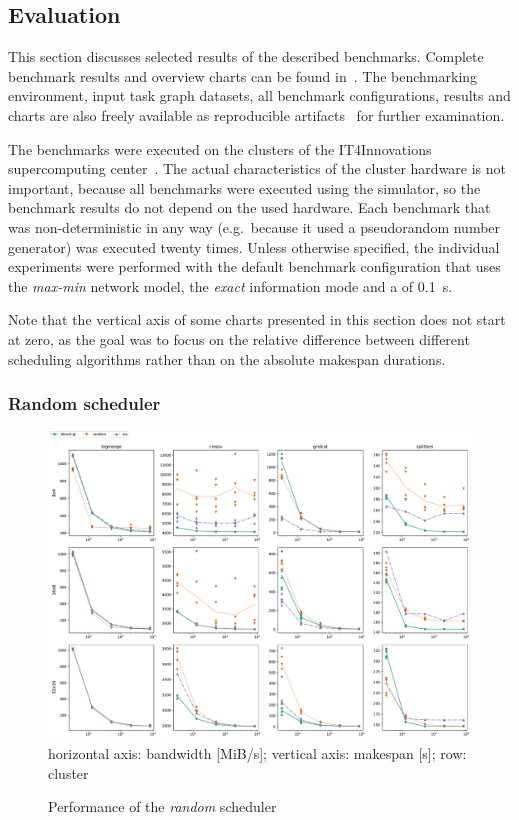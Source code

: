 \subsection{Evaluation}
This section discusses selected results of the described benchmarks. Complete benchmark results and
overview charts can be found in~\cite{estee}. The benchmarking environment, input task
graph datasets, all benchmark configurations, results and charts are also freely available as
reproducible artifacts~\cite{estee_results} for further examination.

The benchmarks were executed on the clusters of the IT4Innovations supercomputing
center~\cite{it4i}. The actual characteristics of the cluster hardware is not
important, because all benchmarks were executed using the \estee{} simulator, so the
benchmark results do not depend on the used hardware. Each benchmark that was non-deterministic in
any way (e.g.\ because it used a pseudorandom number generator) was executed twenty times. Unless
otherwise specified, the individual experiments were performed with the default benchmark
configuration that uses the \emph{max-min} network model, the \emph{exact}
information mode and a  of \SI{0.1}{\second}.

Note that the vertical axis of some charts presented in this section does not start at zero, as the
goal was to focus on the relative difference between different scheduling algorithms rather than on
the absolute makespan durations.

\subsubsection*{Random scheduler}

\begin{figure}
	\centering
	\includegraphics[width=\textwidth]{imgs/estee/charts/random-scheduler}\\
	{\small horizontal axis: bandwidth [MiB/s]; vertical axis:
	makespan [s]; row: cluster}
	\caption{Performance of the \emph{random} scheduler}
	\label{fig:estee-chart-random-scheduler}
\end{figure}

